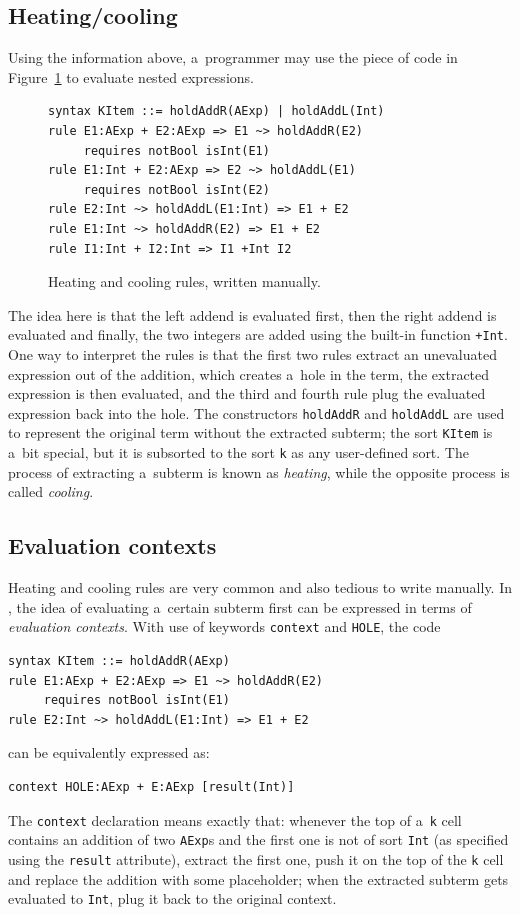 \documentclass[nolot,nolof,nocover,printed]{fithesis3}
\begin{document}
\subsection{Heating/cooling}
Using the information above, a~programmer may use the piece of \K code in Figure~\ref{manualHeatCool} to evaluate nested expressions.
\begin{figure}
\begin{lstlisting}
syntax KItem ::= holdAddR(AExp) | holdAddL(Int)
rule E1:AExp + E2:AExp => E1 ~> holdAddR(E2)
     requires notBool isInt(E1)
rule E1:Int + E2:AExp => E2 ~> holdAddL(E1)
     requires notBool isInt(E2)
rule E2:Int ~> holdAddL(E1:Int) => E1 + E2
rule E1:Int ~> holdAddR(E2) => E1 + E2
rule I1:Int + I2:Int => I1 +Int I2
\end{lstlisting}
\caption{Heating and cooling rules, written manually.}
\label{manualHeatCool}
\end{figure}
The idea here is that the left addend is evaluated first, then the right addend is evaluated and finally, the two integers are added using the built-in function \lstinline|+Int|. One way to interpret the rules is that the first two rules extract an unevaluated expression out of the addition, which creates a~hole in the term, the extracted expression is then evaluated, and the third and fourth rule plug the evaluated expression back into the hole. The constructors \lstinline|holdAddR| and \lstinline|holdAddL| are used to represent the original term without the extracted subterm; the sort \lstinline|KItem| is a~bit special, but it is subsorted to the sort \lstinline|k| as any user-defined sort. The process of extracting a~subterm is known as \textit{heating}, while the opposite process is called \textit{cooling}. 

\subsection{Evaluation contexts}
Heating and cooling rules are very common and also tedious to write manually. In \K, the idea of evaluating a~certain subterm first can be expressed in terms of \textit{evaluation contexts}. With use of keywords \lstinline|context| and \lstinline|HOLE|, the \K code
\begin{lstlisting}
syntax KItem ::= holdAddR(AExp)
rule E1:AExp + E2:AExp => E1 ~> holdAddR(E2)
     requires notBool isInt(E1)
rule E2:Int ~> holdAddL(E1:Int) => E1 + E2
\end{lstlisting}
can be equivalently expressed as:
\begin{lstlisting}
context HOLE:AExp + E:AExp [result(Int)]
\end{lstlisting}
The \lstinline|context| declaration means exactly that: whenever the top of a~\lstinline|k| cell contains an addition of two \lstinline|AExp|s and the first one is not of sort \lstinline|Int| (as specified using the \lstinline|result| attribute), extract the first one, push it on the top of the \lstinline|k| cell and replace the addition with some placeholder; when the extracted subterm gets evaluated to \lstinline|Int|, plug it back to the original context.
\end{document}
